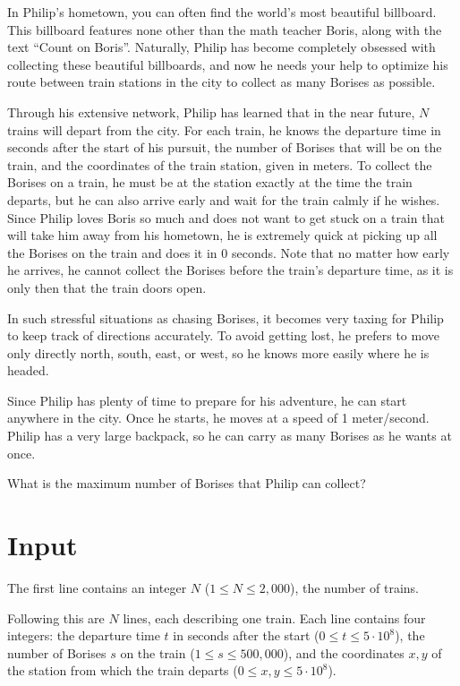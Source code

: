 \noindent
In Philip's hometown, you can often find the world's most beautiful billboard. This billboard features none other than the math teacher Boris, along with the text ``Count on Boris''. Naturally, Philip has become completely obsessed with collecting these beautiful billboards, and now he needs your help to optimize his route between train stations in the city to collect as many Borises as possible.

Through his extensive network, Philip has learned that in the near future, $N$ trains will depart from the city. For each train, he knows the departure time in seconds after the start of his pursuit, the number of Borises that will be on the train, and the coordinates of the train station, given in meters.
To collect the Borises on a train, he must be at the station exactly at the time the train departs, but he can also arrive early and wait for the train calmly if he wishes.
Since Philip loves Boris so much and does not want to get stuck on a train that will take him away from his hometown, he is extremely quick at picking up all the Borises on the train and does it in 0 seconds. Note that no matter how early he arrives, he cannot collect the Borises before the train's departure time, as it is only then that the train doors open.

In such stressful situations as chasing Borises, it becomes very taxing for Philip to keep track of directions accurately. To avoid getting lost, he prefers to move only directly north, south, east, or west, so he knows more easily where he is headed.

Since Philip has plenty of time to prepare for his adventure, he can start anywhere in the city. Once he starts, he moves at a speed of 1 meter/second. Philip has a very large backpack, so he can carry as many Borises as he wants at once.

What is the maximum number of Borises that Philip can collect?

\section*{Input}
The first line contains an integer $N$ ($1 \le N \le 2,000$), the number of trains.

Following this are $N$ lines, each describing one train.
Each line contains four integers: the departure time $t$ in seconds after the start ($0 \le t \le 5 \cdot 10^8$), the number of Borises $s$ on the train ($1 \le s \le 500,000$), and the coordinates $x, y$ of the station from which the train departs ($0 \le x, y \le 5 \cdot 10^8$).

